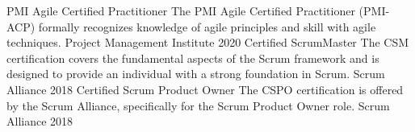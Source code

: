 

\begin{cvhonors}

  \cvhonor
    {PMI Agile Certified Practitioner} %
    {The PMI Agile Certified Practitioner (PMI-ACP) formally recognizes knowledge of agile principles and skill with agile techniques.} %
    {Project Management Institute} %
    {2020} %
\cvhonor
    {Certified ScrumMaster} %
    {The CSM certification covers the fundamental aspects of the Scrum framework and is designed to provide an individual with a strong foundation in Scrum.} %
    {Scrum Alliance} %
    {2018} %
\cvhonor
    {Certified Scrum Product Owner} %
    {The CSPO certification is offered by the Scrum Alliance, specifically for the Scrum Product Owner role.} %
    {Scrum Alliance} %
    {2018} %
\end{cvhonors}
